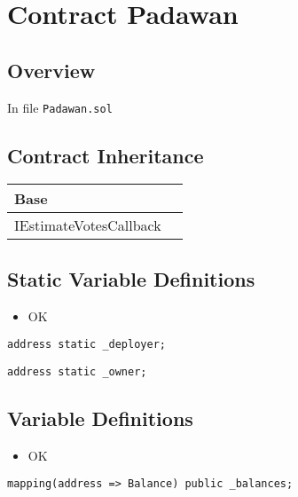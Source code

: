 
\chapter{Contract Padawan}

\minitoc

\section{Overview}


In file {\tt Padawan.sol}

\section{Contract Inheritance}


\noindent\begin{tabular}{|l|p{5cm}|}\hline
Base & \\\hline
IEstimateVotesCallback & \\\hline
\end{tabular}


\section{Static Variable Definitions}

\begin{itemize}
\item OK
\end{itemize}

\begin{lstlisting}[firstnumber=32]
    address static _deployer;
\end{lstlisting}

\begin{lstlisting}[firstnumber=33]
    address static _owner;
\end{lstlisting}

\section{Variable Definitions}

\begin{itemize}
\item OK
\end{itemize}

\begin{lstlisting}[firstnumber=35]
    mapping(address => Balance) public _balances;
\end{lstlisting}

